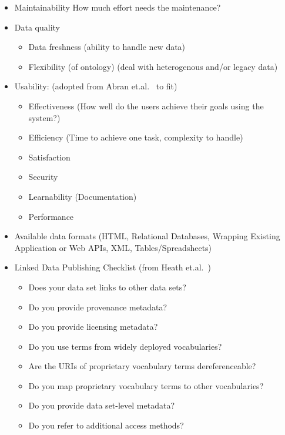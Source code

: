 \begin{itemize}
\item Maintainability
How much effort needs the maintenance? 

\item Data quality 
\begin{itemize}
\item Data freshness (ability to handle new data)
\item Flexibility (of ontology) (deal with heterogenous and/or legacy data)
\end{itemize}

\item Usability: (adopted from Abran et.al.~\cite{abran2003usability} to fit)
\begin{itemize}
\item Effectiveness (How well do the users achieve their goals using the system?)
\item Efficiency (Time to achieve one task, complexity to handle)
\item Satisfaction
\item Security
\item Learnability (Documentation)
\item Performance
\end{itemize}

\item Available data formats (HTML, Relational Databases, Wrapping Existing Application or Web APIs, XML, Tables/Spreadsheets)

\item Linked Data Publishing Checklist (from Heath et.al.~\cite{heath2011linked})
\begin{itemize}
\item Does your data set links to other data sets?
\item Do you provide provenance metadata?
\item Do you provide licensing metadata?
\item Do you use terms from widely deployed vocabularies?
\item Are the URIs of proprietary vocabulary terms dereferenceable?
\item Do you map proprietary vocabulary terms to other vocabularies?
\item Do you provide data set-level metadata?
\item Do you refer to additional access methods?
\end{itemize}
\end{itemize}

